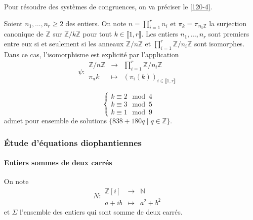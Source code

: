 
  Pour résoudre des systèmes de congruences, on va préciser le \cref{120-4}.

  \begin{theorem}[Chinois]
    Soient $n_1, \dots, n_r \geq 2$ des entiers. On note $n = \prod_{i=1}^r n_i$ et $\pi_k = \pi_{{n_k}\mathbb{Z}}$ la surjection canonique de $\mathbb{Z}$ sur $\mathbb{Z}/k\mathbb{Z}$ pour tout $k \in \llbracket 1, r \rrbracket$.
    \newpar
    Les entiers $n_1, \dots, n_r$ sont premiers entre eux si et seulement si les anneaux $\mathbb{Z}/n\mathbb{Z}$ et $\prod_{i=1}^{r}\mathbb{Z}/n_i\mathbb{Z}$ sont isomorphes. Dans ce cas, l'isomorphisme est explicité par l'application
    \[
      \psi :
      \begin{array}{ccc}
        \mathbb{Z}/n\mathbb{Z} &\rightarrow& \prod_{i=1}^{r}\mathbb{Z}/n_i\mathbb{Z} \\
        \pi_{n}{k} &\mapsto& (\pi_i(k))_{i \in \llbracket 1, r \rrbracket}
      \end{array}
    \]
  \end{theorem}


  \begin{example}
    \[
      \begin{cases}
        k \equiv 2 \mod 4 \\
        k \equiv 3 \mod 5 \\
        k \equiv 1 \mod 9
      \end{cases}
    \]
    admet pour ensemble de solutions $\{ 838+180q \mid q \in \mathbb{Z} \}$.
  \end{example}

  \subsubsection{Étude d'équations diophantiennes}

  \paragraph{Entiers sommes de deux carrés}


  \begin{notation}
    On note \[ N :
    \begin{array}{ccc}
      \mathbb{Z}[i] &\rightarrow& \mathbb{N} \\
      a+ib &\mapsto& a^2 + b^2
    \end{array}
    \] et $\Sigma$ l'ensemble des entiers qui sont somme de deux carrés.
  \end{notation}

